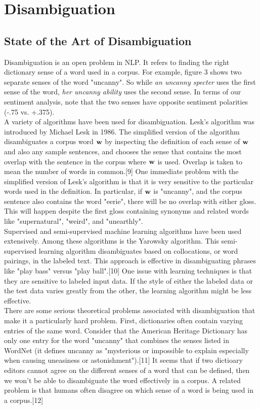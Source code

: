 \documentclass[pageno]{jpaper}
\begin{document}
\section{Disambiguation}
\subsection{State of the Art of Disambiguation}
Disambiguation is an open problem in NLP. It refers to finding the right dictionary sense of a word used in a corpus. For example, figure 3 shows two separate senses of the word "uncanny". So while \textit{an uncanny specter} uses the first sense of the word, \textit{her uncanny ability} uses the second sense. In terms of our sentiment analysis, note that the two senses have opposite sentiment polarities (-.75 vs. +.375). \\
\indent A variety of algorithms have been used for disambiguation. Lesk's algorithm was introduced by Michael Lesk in 1986. The simplified version of the algorithm disambiguates a corpus word ${\bf w}$ by inspecting the definition of each sense of ${\bf w}$ and also any sample sentences, and chooses the sense that contains the most overlap with the sentence in the corpus where ${\bf w}$ is used. Overlap is taken to mean the number of words in common.[9] One immediate problem with the simplified version of Lesk's algorithm is that it is very sensitive to the particular words used in the definition. In particular, if ${\bf w}$ is "uncanny", and the corpus sentence also contains the word "eerie", there will be no overlap with either gloss. This will happen despite the first gloss containing synonyms and related words like "supernatural", "weird", and "unearthly". \\
\indent Supervised and semi-supervised machine learning algorithms have been used extensively.  Among these algorithms is the Yarowsky algorithm. This semi-supervised learning algorithm disambiguates based on collocations, or word pairings, in the labeled text. This approach is effective in disambiguating phrases like "play bass" versus "play ball".[10] One issue with learning techniques is that they are sensitive to labeled input data. If the style of either the labeled data or the test data varies greatly from the other, the learning algorithm might be less effective. \\
\indent There are some serious theoretical problems associated with disambiguation that make it a particularly hard problem. First, dictionaries often contain varying entries of the same word. Consider that the American Heritage Dictionary has only one entry for the word "uncanny" that combines the senses listed in WordNet (it defines uncanny as "mysterious or impossible to explain especially when causing uneasiness or astonishment").[11] It seems that if two dictioary editors cannot agree on the different senses of a word that can be defined, then we won't be able to disambiguate the word effectively in a corpus. A related problem is that humans often disagree on which sense of a word is being used in a corpus.[12]
\end{document}
